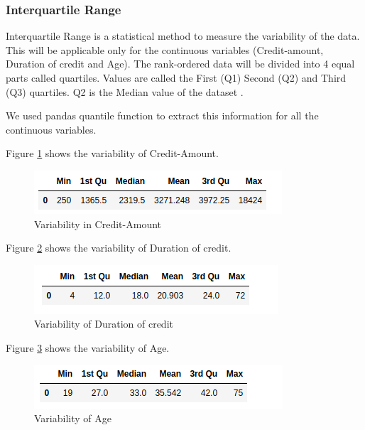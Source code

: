 \documentclass[sigconf]{acmart}
\begin{document}
\subsubsection{Interquartile Range}

Interquartile Range is a statistical method to measure the variability of the data. This will be applicable only for the continuous variables (Credit-amount, Duration of credit and Age). The rank-ordered data will be divided into 4 equal parts called quartiles. Values are called the First (Q1) Second (Q2) and Third (Q3) quartiles. Q2 is the Median value of the dataset \cite{stat-trek-statistics}.

We used pandas quantile function to extract this information for all the continuous variables.

Figure \ref{fig:Figure14} shows the variability of Credit-Amount.

\begin{figure}[htb]
  \centering
  \includegraphics[width=1.0\columnwidth]{images/Figure14.png}
  \caption{Variability in Credit-Amount}
  \label{fig:Figure14} 
\end{figure}

Figure \ref{fig:Figure15} shows the variability of Duration of credit.

\begin{figure}[htb]
  \centering
  \includegraphics[width=1.0\columnwidth]{images/Figure15.png}
  \caption{Variability of Duration of credit}
  \label{fig:Figure15} 
\end{figure}

Figure \ref{fig:Figure16} shows the variability of Age.

\begin{figure}[htb]
  \centering
  \includegraphics[width=1.0\columnwidth]{images/Figure16.png}
  \caption{Variability of Age}
  \label{fig:Figure16} 
\end{figure}
\end{document}
